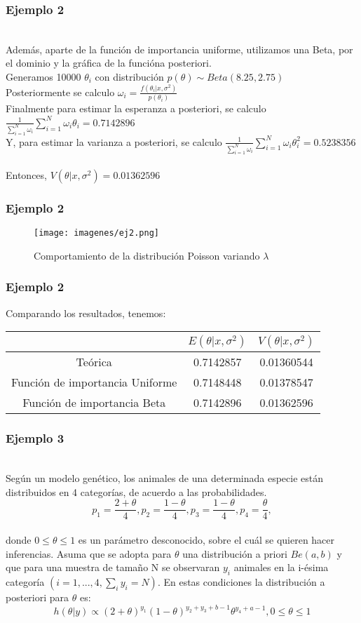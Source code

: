\documentclass[12pt]{beamer}
\begin{document}
\begin{frame}
\frametitle{Ejemplo 2}
~\\Además, aparte de la función de importancia uniforme, utilizamos una Beta, por el dominio y la gráfica de la funcióna  posteriori.
~\\Generamos 10000 $\theta_{i}$ con distribución $p(\theta)\sim Beta(8.25,2.75)$
~\\Posteriormente se calculo $\omega_{i}=\frac{f(\theta_{i}|x,\sigma^2)}{p(\theta_{i})}$
~\\Finalmente para estimar la esperanza a posteriori, se calculo $\frac{1}{\sum\limits_{i=1}^{N}\omega_{i}}\sum\limits_{i=1}^{N}\omega_{i}\theta_{i}=0.7142896$
~\\Y, para estimar la varianza a posteriori, se calculo $\frac{1}{\sum\limits_{i=1}^{N}\omega_{i}}\sum\limits_{i=1}^{N}\omega_{i}\theta_{i}^2=0.5238356$
~\\Entonces, $V(\theta|x,\sigma^2)=0.01362596$
\end{frame}

\begin{frame}
\frametitle{Ejemplo 2}
\begin{figure}[!h]
    \begin{center}
        \texttt{[image: imagenes/ej2.png]}
        \caption{Comportamiento de la distribución Poisson variando $\lambda$}
        \label{fig:Densidad}
    \end{center}
\end{figure}
\end{frame}

\begin{frame}
\frametitle{Ejemplo 2}
Comparando los resultados, tenemos:
\begin{tabular}{|c|c|c|}
\hline 
 & $E(\theta|x,\sigma^2)$ & $V(\theta|x,\sigma^2)$ \\ 
\hline 
Teórica & 0.7142857 & 0.01360544 \\ 
Función de importancia Uniforme &  0.7148448 & 0.01378547 \\ 
Función de importancia Beta & 0.7142896 & 0.01362596 \\
\hline 
\end{tabular} 
\end{frame}

\begin{frame}
\frametitle{Ejemplo 3}
~\\Según un modelo genético, los animales de una determinada especie están distribuidos en 4 categorías, de acuerdo a las probabilidades.
$$p_{1}=\frac{2+\theta}{4}, p_{2}=\frac{1-\theta}{4}, p_{3}=\frac{1-\theta}{4}, p_{4}=\frac{\theta}{4},$$
~\\donde $0\leq \theta \leq 1$ es un parámetro desconocido, sobre el cuál se quieren hacer inferencias. Asuma que se adopta para $\theta$ una distribución a priori $Be(a,b)$ y que para una muestra de tamaño N se observaran $y_{i}$ animales en la i-ésima categoría $(i=1,...,4, \sum_{i}y_{i}=N)$. En estas condiciones la distribución a posteriori para $\theta$ es:
$$h(\theta|y)\propto(2+\theta)^{y_{1}}(1-\theta)^{y_{2}+y_{3}+b-1}\theta^{y_{4}+a-1},   0\leq\theta\leq1 $$
\end{frame}
\end{document}
